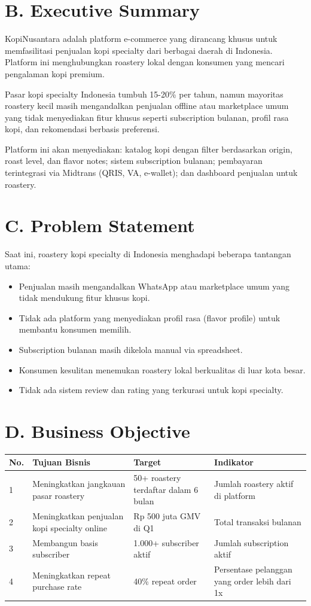 \documentclass[11pt,a4paper]{article}
\begin{document}
\section{B. Executive Summary}
KopiNusantara adalah platform e-commerce yang dirancang khusus untuk memfasilitasi penjualan kopi specialty dari berbagai daerah di Indonesia. Platform ini menghubungkan roastery lokal dengan konsumen yang mencari pengalaman kopi premium.

Pasar kopi specialty Indonesia tumbuh 15-20\% per tahun, namun mayoritas roastery kecil masih mengandalkan penjualan offline atau marketplace umum yang tidak menyediakan fitur khusus seperti subscription bulanan, profil rasa kopi, dan rekomendasi berbasis preferensi.

Platform ini akan menyediakan: katalog kopi dengan filter berdasarkan origin, roast level, dan flavor notes; sistem subscription bulanan; pembayaran terintegrasi via Midtrans (QRIS, VA, e-wallet); dan dashboard penjualan untuk roastery.

\section{C. Problem Statement}
Saat ini, roastery kopi specialty di Indonesia menghadapi beberapa tantangan utama:
\begin{itemize}[noitemsep,leftmargin=1.5cm]
\item Penjualan masih mengandalkan WhatsApp atau marketplace umum yang tidak mendukung fitur khusus kopi.
\item Tidak ada platform yang menyediakan profil rasa (flavor profile) untuk membantu konsumen memilih.
\item Subscription bulanan masih dikelola manual via spreadsheet.
\item Konsumen kesulitan menemukan roastery lokal berkualitas di luar kota besar.
\item Tidak ada sistem review dan rating yang terkurasi untuk kopi specialty.
\end{itemize}

\section{D. Business Objective}
\noindent\small
\begin{tabularx}{\textwidth}{|p{0.8cm}|X|X|X|}
\hline
\centering\textbf{No.}\arraybackslash & \centering\textbf{Tujuan Bisnis}\arraybackslash & \centering\textbf{Target}\arraybackslash & \centering\textbf{Indikator}\arraybackslash \\\hline
1 & Meningkatkan jangkauan pasar roastery & 50+ roastery terdaftar dalam 6 bulan & Jumlah roastery aktif di platform \\\hline
2 & Meningkatkan penjualan kopi specialty online & Rp 500 juta GMV di Q1 & Total transaksi bulanan \\\hline
3 & Membangun basis subscriber & 1.000+ subscriber aktif & Jumlah subscription aktif \\\hline
4 & Meningkatkan repeat purchase rate & 40\% repeat order & Persentase pelanggan yang order lebih dari 1x \\\hline
\end{tabularx}\normalsize
\end{document}
